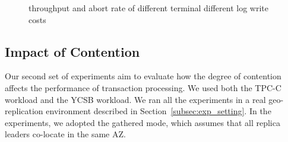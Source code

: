 \documentclass[conference]{IEEEtran}
\begin{document}
\begin{figure}[htbp]
  \centering
  

\caption{throughput and abort rate of
different terminal different log write costs}
\label{fig:new_order_add_log_cost}
\end{figure}


\subsection{Impact of Contention}

Our second set of experiments aim to evaluate how the degree of contention affects the performance of transaction processing.
We used both the TPC-C workload and the YCSB workload.
We ran all the experiments in a real geo-replication environment described in Section~\ref{subsec:exp_setting}.
In the experiments, we adopted the gathered mode, which assumes that all replica leaders co-locate in the same AZ. 
\end{document}
